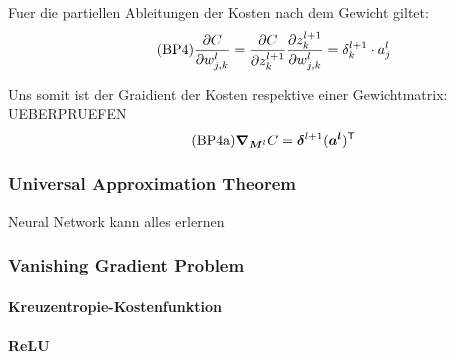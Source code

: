 \documentclass[../main]{subfiles}
\begin{document}
Fuer die partiellen Ableitungen der Kosten nach dem Gewicht giltet:
\begin{equation}\tag{BP4}
  \frac{\partial C}{\partial w_{j,k}^l} = \frac{\partial C}{\partial z_k^{l+1}} \frac{\partial z_k^{l+1}}{\partial w_{j,k}^l} = \delta_k^{l+1} \cdot a_j^l
\end{equation}

Uns somit ist der Graidient der Kosten respektive einer Gewichtmatrix:
UEBERPRUEFEN
\begin{equation}\tag{BP4a}
  \bm{\nabla}_{\bm{M}^l} C = \bm{\delta}^{l+1} (\bm{a^l})^{\mathsf{T}}
\end{equation}



\cite{Nielsen}

\pagebreak

\subsubsection{Universal Approximation Theorem}\label{sec:UAT}
Neural Network kann alles erlernen

\subsubsection{Vanishing Gradient Problem}

\paragraph{Kreuzentropie-Kostenfunktion}

\paragraph{ReLU}

\pagebreak
\end{document}

